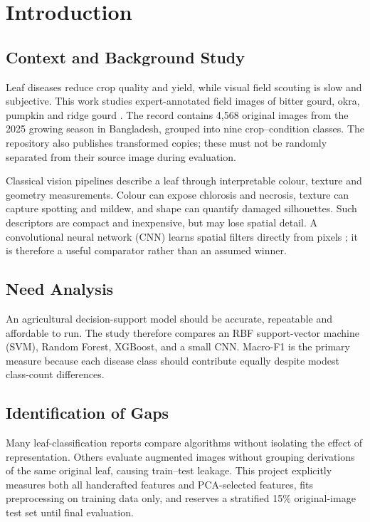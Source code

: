 \chapter{Introduction}

\section{Context and Background Study}
Leaf diseases reduce crop quality and yield, while visual field scouting is slow and subjective. This work studies expert-annotated field images of bitter gourd, okra, pumpkin and ridge gourd \cite{dataset}. The record contains 4,568 original images from the 2025 growing season in Bangladesh, grouped into nine crop--condition classes. The repository also publishes transformed copies; these must not be randomly separated from their source image during evaluation.

Classical vision pipelines describe a leaf through interpretable colour, texture and geometry measurements. Colour can expose chlorosis and necrosis, texture can capture spotting and mildew, and shape can quantify damaged silhouettes. Such descriptors are compact and inexpensive, but may lose spatial detail. A convolutional neural network (CNN) learns spatial filters directly from pixels \cite{krizhevsky}; it is therefore a useful comparator rather than an assumed winner.

\section{Need Analysis}
An agricultural decision-support model should be accurate, repeatable and affordable to run. The study therefore compares an RBF support-vector machine (SVM), Random Forest, XGBoost, and a small CNN. Macro-F1 is the primary measure because each disease class should contribute equally despite modest class-count differences.

\section{Identification of Gaps}
Many leaf-classification reports compare algorithms without isolating the effect of representation. Others evaluate augmented images without grouping derivations of the same original leaf, causing train--test leakage. This project explicitly measures both all handcrafted features and PCA-selected features, fits preprocessing on training data only, and reserves a stratified 15\% original-image test set until final evaluation.

